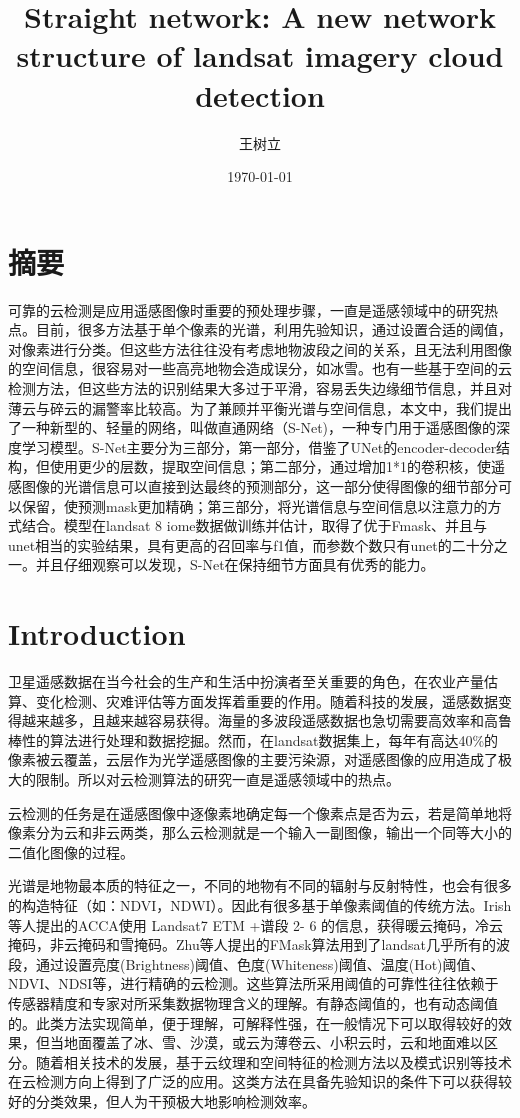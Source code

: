 \documentclass[UTF8]{ctexart}
\begin{document}
\title{Straight network: A new network structure of landsat imagery cloud detection}
\author{王树立}
\date{\today}

\maketitle
\section*{摘要}
可靠的云检测是应用遥感图像时重要的预处理步骤，一直是遥感领域中的研究热点。目前，很多方法基于单个像素的光谱，利用先验知识，通过设置合适的阈值，对像素进行分类。但这些方法往往没有考虑地物波段之间的关系，且无法利用图像的空间信息，很容易对一些高亮地物会造成误分，如冰雪。也有一些基于空间的云检测方法，但这些方法的识别结果大多过于平滑，容易丢失边缘细节信息，并且对薄云与碎云的漏警率比较高。为了兼顾并平衡光谱与空间信息，本文中，我们提出了一种新型的、轻量的网络，叫做直通网络（S-Net)，一种专门用于遥感图像的深度学习模型。S-Net主要分为三部分，第一部分，借鉴了UNet的encoder-decoder结构，但使用更少的层数，提取空间信息；第二部分，通过增加1*1的卷积核，使遥感图像的光谱信息可以直接到达最终的预测部分，这一部分使得图像的细节部分可以保留，使预测mask更加精确；第三部分，将光谱信息与空间信息以注意力的方式结合。模型在landsat 8 iome数据做训练并估计，取得了优于Fmask、并且与unet相当的实验结果，具有更高的召回率与f1值，而参数个数只有unet的二十分之一。并且仔细观察可以发现，S-Net在保持细节方面具有优秀的能力。


\section[]{Introduction}
卫星遥感数据在当今社会的生产和生活中扮演者至关重要的角色，在农业产量估算\cite{prasad2006crop}、变化检测\cite{verbesselt2010detecting}、灾难评估\cite{joyce2009review}等方面发挥着重要的作用。随着科技的发展，遥感数据变得越来越多，且越来越容易获得。海量的多波段遥感数据也急切需要高效率和高鲁棒性的算法进行处理和数据挖掘。然而，在landsat数据集上，每年有高达40\%的像素被云覆盖\cite{ju2008availability}，云层作为光学遥感图像的主要污染源，对遥感图像的应用造成了极大的限制。所以对云检测算法的研究一直是遥感领域中的热点。

云检测的任务是在遥感图像中逐像素地确定每一个像素点是否为云，若是简单地将像素分为云和非云两类，那么云检测就是一个输入一副图像，输出一个同等大小的二值化图像的过程。

光谱是地物最本质的特征之一，不同的地物有不同的辐射与反射特性，也会有很多的构造特征（如：NDVI，NDWI）。因此有很多基于单像素阈值的传统方法\cite{sun2018cloud}。Irish等人\cite{irish2006characterization}提出的ACCA使用 Landsat7 ETM +谱段 2- 6 的信息，获得暖云掩码，冷云掩码，非云掩码和雪掩码。Zhu等人提出的FMask算法\cite{zhu2012object}用到了landsat几乎所有的波段，通过设置亮度(Brightness)阈值、色度(Whiteness)阈值、温度(Hot)阈值、NDVI、NDSI等，进行精确的云检测。这些算法所采用阈值的可靠性往往依赖于传感器精度和专家对所采集数据物理含义的理解。有静态阈值的，也有动态阈值的。此类方法实现简单，便于理解，可解释性强，在一般情况下可以取得较好的效果，但当地面覆盖了冰、雪、沙漠，或云为薄卷云、小积云时，云和地面难以区分。随着相关技术的发展，基于云纹理和空间特征的检测方法以及模式识别等技术在云检测方向上得到了广泛的应用。这类方法在具备先验知识的条件下可以获得较好的分类效果，但人为干预极大地影响检测效率。
\end{document}
